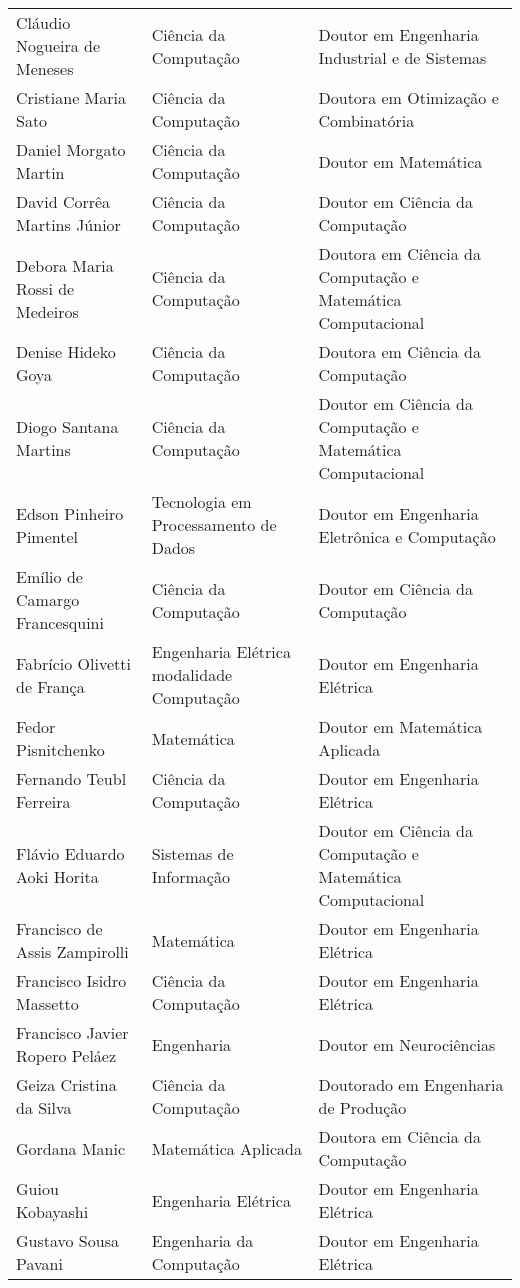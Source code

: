 {\begin{longtable}{|p{}|p{}|p{}|}
    Cláudio Nogueira de Meneses & Ciência da Computação & Doutor em Engenharia Industrial e de Sistemas \\
    Cristiane Maria Sato & Ciência da Computação & Doutora em Otimização e Combinatória \\
    Daniel Morgato Martin & Ciência da Computação & Doutor em Matemática \\
    David Corrêa Martins Júnior & Ciência da Computação & Doutor em Ciência da Computação \\
    Debora Maria Rossi de Medeiros & Ciência da Computação & Doutora em Ciência da Computação e Matemática Computacional \\
    Denise Hideko Goya & Ciência da Computação & Doutora em Ciência da Computação \\
    Diogo Santana Martins & Ciência da Computação & Doutor em Ciência da Computação e Matemática Computacional \\
    Edson Pinheiro Pimentel & Tecnologia em Processamento de Dados & Doutor em Engenharia Eletrônica e Computação \\
    Emílio de Camargo Francesquini & Ciência da Computação & Doutor em Ciência da Computação \\
    Fabrício Olivetti de França & Engenharia Elétrica modalidade Computação & Doutor em Engenharia Elétrica \\
    Fedor Pisnitchenko & Matemática & Doutor em Matemática Aplicada \\
    Fernando Teubl Ferreira & Ciência da Computação & Doutor em Engenharia Elétrica \\
    Flávio Eduardo Aoki Horita & Sistemas de Informação & Doutor em Ciência da Computação e Matemática Computacional \\
    Francisco de Assis Zampirolli & Matemática & Doutor em Engenharia Elétrica \\
    Francisco Isidro Massetto & Ciência da Computação & Doutor em Engenharia Elétrica \\
    Francisco Javier Ropero Peláez & Engenharia & Doutor em Neurociências \\
    Geiza Cristina da Silva & Ciência da Computação & Doutorado em Engenharia de Produção \\
    Gordana Manic & Matemática Aplicada & Doutora em Ciência da Computação \\
    Guiou Kobayashi & Engenharia Elétrica & Doutor em Engenharia Elétrica \\
    Gustavo Sousa Pavani & Engenharia da Computação & Doutor em Engenharia Elétrica \\

\end{longtable}}
